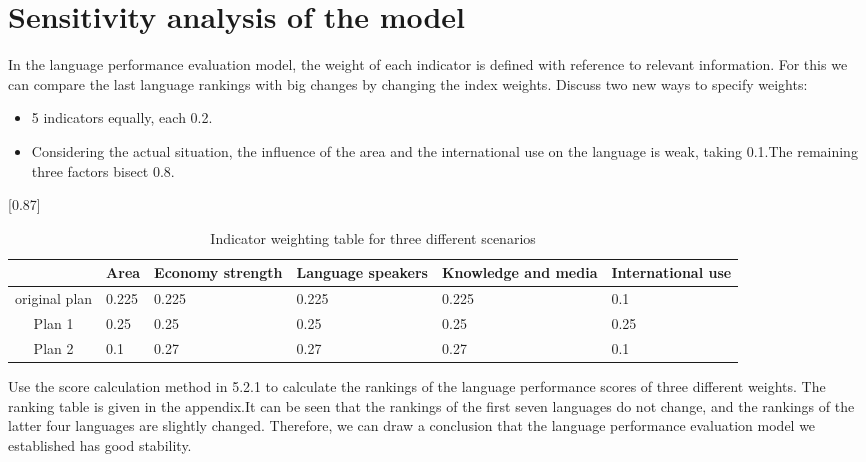 \section{Sensitivity analysis of the model}
\noindent
In the language performance evaluation model, the weight of each indicator is defined with reference to relevant information. For this we can compare the last language rankings with big changes by changing the index weights. Discuss two new ways to specify weights:

\begin{itemize}
	\item 5 indicators equally, each 0.2.
	\item Considering the actual situation, the influence of the area and the international use on the language is weak, taking 0.1.The remaining three factors bisect 0.8.
\end{itemize}


\begin{table}[H]
	\centering
	\caption{Indicator weighting table for three different scenarios}
	\scalebox{0.87}[0.87]{%
	\begin{tabular}{cp{5em}p{5em}p{5em}p{5em}p{6em}}
		\toprule
		 & Area & Economy strength & Language speakers & Knowledge and media &International use\\
		\midrule
		original plan & 0.225 & 0.225 & 0.225 & 0.225 & 0.1 \\
		\midrule
		Plan 1 & 0.25  & 0.25  & 0.25  & 0.25  & 0.25 \\
		\midrule
		Plan 2 & 0.1   & 0.27  & 0.27  & 0.27  & 0.1 \\
		\bottomrule
	\end{tabular}%
}
	\label{tab:addlabel}%
\end{table}%


Use the score calculation method in 5.2.1 to calculate the rankings of the language performance scores of three different weights. The ranking table is given in the appendix.It can be seen that the rankings of the first seven languages do not change, and the rankings of the latter four languages are slightly changed. Therefore, we can draw a conclusion that the language performance evaluation model we established has good stability.